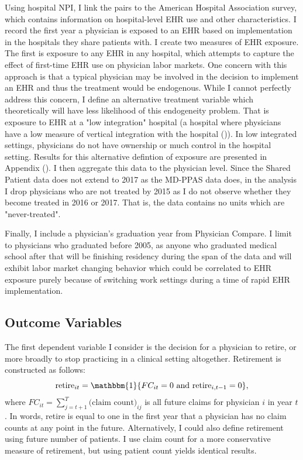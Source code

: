\documentclass[11pt]{article}
\begin{document}
Using hospital NPI, I link the pairs to the American Hospital Association survey, which contains information on hospital-level EHR use and other characteristics. I record the first year a physician is exposed to an EHR based on implementation in the hospitals they share patients with. I create two measures of EHR exposure. The first is exposure to any EHR in any hospital, which attempts to capture the effect of first-time EHR use on physician labor markets. One concern with this approach is that a typical physician may be involved in the decision to implement an EHR and thus the treatment would be endogenous. While I cannot perfectly address this concern, I define an alternative treatment variable which theoretically will have less likelihood of this endogeneity problem. That is exposure to EHR at a "low integration" hospital (a hospital where physicians have a low measure of vertical integration with the hospital (\cite{madison2004hospital})). In low integrated settings, physicians do not have ownership or much control in the hospital setting. Results for this alternative defintion of exposure are presented in Appendix (). I then aggregate this data to the physician level. Since the Shared Patient data does not extend to 2017 as the MD-PPAS data does, in the analysis I drop physicians who are not treated by 2015 as I do not observe whether they become treated in 2016 or 2017. That is, the data contains no units which are "never-treated".

Finally, I include a physician's graduation year from Physician Compare. I limit to physicians who graduated before 2005, as anyone who graduated medical school after that will be finishing residency during the span of the data and will exhibit labor market changing behavior which could be correlated to EHR exposure purely because of switching work settings during a time of rapid EHR implementation.

\subsection{Outcome Variables}

The first dependent variable I consider is the decision for a physician to retire, or more broadly to stop practicing in a clinical setting altogether. Retirement is constructed as follows: 
$$\text{retire}_{it}=\mathbbm{1}\{FC_{it}=0 \text{ and retire}_{i,t-1}=0\}, $$
where $FC_{it}=\sum\limits_{j=t+1}^T\text{(claim count)}_{ij}$ is all future claims for physician $i$ in year $t$. In words, retire is equal to one in the first year that a physician has no claim counts at any point in the future. Alternatively, I could also define retirement using future number of patients. I use claim count for a more conservative measure of retirement, but using patient count yields identical results.
\end{document}
